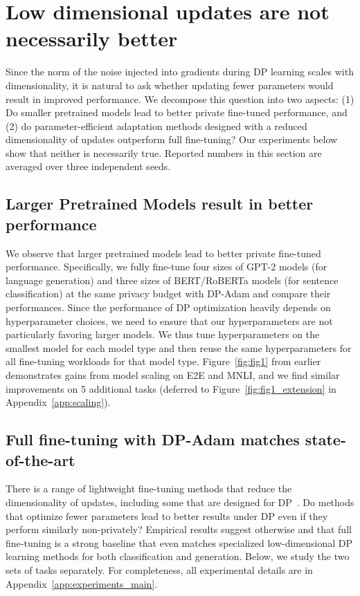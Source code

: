 \section{Low dimensional updates are not necessarily better}\label{sec:dimensionality}
Since the norm of the noise injected into gradients during DP learning scales with dimensionality, it is natural to ask whether updating fewer parameters would result in improved performance.
We decompose this question into two aspects: (1) Do smaller pretrained models lead to better private fine-tuned performance, and (2) do parameter-efficient adaptation methods designed with a reduced dimensionality of updates outperform full fine-tuning?
Our experiments below show that neither is necessarily true.
Reported numbers in this section are averaged over three independent seeds.

\subsection{Larger Pretrained Models result in better performance}
We observe that larger pretrained models lead to better private fine-tuned performance. 
Specifically, we fully fine-tune four sizes of GPT-2 models (for language generation) and three sizes of BERT/RoBERTa models (for sentence classification) at the same privacy budget with DP-Adam and compare their performances. 
Since the performance of DP optimization heavily depends on hyperparameter choices, we need to ensure that our hyperparameters are not particularly favoring larger models. 
We thus tune hyperparameters on the smallest model for each model type and then reuse the same hyperparameters for all fine-tuning workloads for that model type.
Figure~\ref{fig:fig1} from earlier demonstrates gains from model scaling on E2E and MNLI, and we find similar improvements on 5 additional tasks (deferred to Figure~\ref{fig:fig1_extension} in Appendix~\ref{app:scaling}).

\subsection{Full fine-tuning with DP-Adam matches state-of-the-art}\label{sec:experiments_main}
There is a range of lightweight fine-tuning methods that reduce the dimensionality of updates, including some that are designed for DP~\citep{yu2021large}.
Do methods that optimize fewer parameters lead to better results under DP even if they perform similarly non-privately? Empirical results suggest otherwise and that full fine-tuning is a strong baseline that even matches specialized low-dimensional DP learning methods for both classification and generation.
Below, we study the two sets of tasks separately. 
For completeness, all experimental details are in Appendix~\ref{app:experiments_main}.

